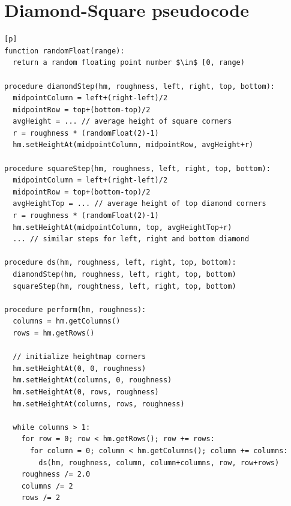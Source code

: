 \documentclass[11pt,a4paper,twoside,openright]{report}
\begin{document}
\chapter{Diamond-Square pseudocode}
\label{app:dspseudo}
\begin{lstlisting}[caption=DS pseudocode, mathescape=true][p]
function randomFloat(range):
  return a random floating point number $\in$ [0, range)

procedure diamondStep(hm, roughness, left, right, top, bottom):
  midpointColumn = left+(right-left)/2
  midpointRow = top+(bottom-top)/2
  avgHeight = ... // average height of square corners
  r = roughness * (randomFloat(2)-1)
  hm.setHeightAt(midpointColumn, midpointRow, avgHeight+r)

procedure squareStep(hm, roughness, left, right, top, bottom):
  midpointColumn = left+(right-left)/2
  midpointRow = top+(bottom-top)/2
  avgHeightTop = ... // average height of top diamond corners
  r = roughness * (randomFloat(2)-1)
  hm.setHeightAt(midpointColumn, top, avgHeightTop+r)
  ... // similar steps for left, right and bottom diamond

procedure ds(hm, roughness, left, right, top, bottom):
  diamondStep(hm, roughness, left, right, top, bottom)
  squareStep(hm, roughtness, left, right, top, bottom)

procedure perform(hm, roughness):
  columns = hm.getColumns()
  rows = hm.getRows()

  // initialize heightmap corners
  hm.setHeightAt(0, 0, roughness)
  hm.setHeightAt(columns, 0, roughness)
  hm.setHeightAt(0, rows, roughness)
  hm.setHeightAt(columns, rows, roughness)

  while columns > 1:
    for row = 0; row < hm.getRows(); row += rows:
      for column = 0; column < hm.getColumns(); column += columns:
        ds(hm, roughness, column, column+columns, row, row+rows)
    roughness /= 2.0
    columns /= 2
    rows /= 2
\end{lstlisting}
\end{document}
